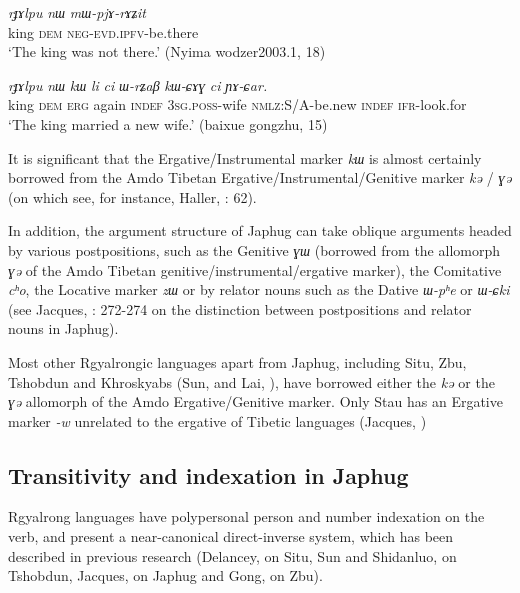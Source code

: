 \documentclass[oneside,a4paper,11pt]{article}
\newcommand{\ipa}[1]{{\phon\textit{\mbox{#1}}}} %
\begin{document}
 \begin{exe}
\ex \label{ex:abs}
\gll
\ipa{rɟɤlpu}  	\ipa{nɯ}  	\ipa{mɯ-pjɤ-rɤʑit}  \\
king \textsc{dem} \textsc{neg-evd.ipfv}-be.there \\
 \glt `The king was not there.' (Nyima wodzer2003.1, 18)
\end{exe}

 \begin{exe}
\ex \label{ex:erg}
\gll 
\ipa{rɟɤlpu}  	\ipa{nɯ}  	\ipa{kɯ}  	\ipa{li}  	\ipa{ci}  	\ipa{ɯ-rʑaβ}  	\ipa{kɯ-ɕɤɣ}  	\ipa{ci}  	\ipa{ɲɤ-ɕar.}  	 \\
king \textsc{dem} \textsc{erg} again \textsc{indef} \textsc{3sg.poss}-wife \textsc{nmlz}:S/A-be.new \textsc{indef}  \textsc{ifr}-look.for \\
\glt `The king married a new wife.' (baixue gongzhu, 15)
\end{exe}

It is significant that the Ergative/Instrumental marker \ipa{kɯ} is almost certainly borrowed from the Amdo Tibetan Ergative/Instrumental/Genitive marker \ipa{kə} / \ipa{ɣə} (on which see, for instance, Haller, \citeyear{haller04themchen}: 62).

In addition, the argument structure of Japhug can take oblique arguments headed by various postpositions, such as the Genitive \ipa{ɣɯ} (borrowed from the allomorph \ipa{ɣə} of the Amdo Tibetan genitive/instrumental/ergative marker), the Comitative \ipa{cʰo}, the Locative marker \ipa{zɯ} or by relator nouns such as the Dative  \ipa{ɯ-pʰe} or \ipa{ɯ-ɕki} (see Jacques, \citeyear{jacques14linking}: 272-274 on the distinction between postpositions and relator nouns in Japhug).

Most other Rgyalrongic languages apart from Japhug, including Situ, Zbu, Tshobdun and Khroskyabs (Sun, \citeyear{jackson98morphology} and Lai, \citeyear{lai13affixale}), have borrowed either the \ipa{kə} or the \ipa{ɣə} allomorph of the Amdo  Ergative/Genitive marker. Only Stau has an Ergative marker \ipa{-w} unrelated to the ergative of Tibetic languages (Jacques, \citeyear{jacques14rtau})

\subsection{Transitivity and indexation in Japhug}
Rgyalrong languages have polypersonal person and number indexation on the verb, and present a near-canonical direct-inverse system, which has been described in previous research (Delancey, \citeyear{delancey81direction} on Situ,  Sun and Shidanluo, \citeyear{jackson02rentongdengdi} on Tshobdun,  Jacques, \citeyear{jacques10inverse} on Japhug and Gong, \citeyear{gongxun14agreement} on Zbu). 
\end{document}
